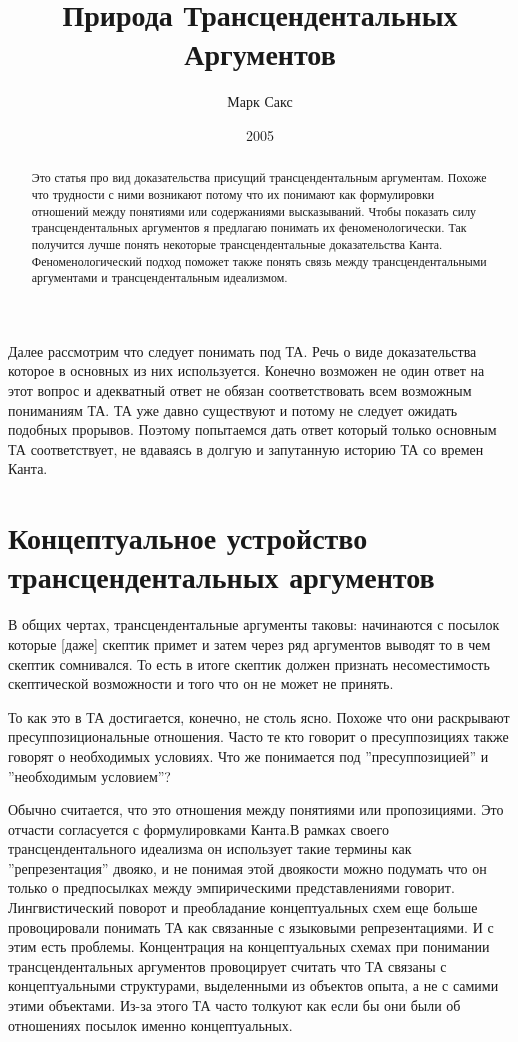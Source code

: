 \documentclass{article}
\title{Природа Трансцендентальных Аргументов}
\author{Марк Сакс}
\date{2005}
\begin{document}
\maketitle

\begin{abstract}
Это статья про вид доказательства присущий трансцендентальным аргументам. Похоже что трудности с ними возникают потому что их понимают как формулировки отношений между понятиями или содержаниями высказываний. Чтобы показать силу трансцендентальных аргументов я предлагаю понимать их феноменологически. Так получится лучше понять некоторые трансцендентальные доказательства Канта. Феноменологический подход поможет также понять связь между трансцендентальными аргументами и трансцендентальным идеализмом.
\end{abstract}

Далее рассмотрим что следует понимать под ТА. Речь о виде доказательства которое в основных из них используется. Конечно возможен не один ответ на этот вопрос и адекватный ответ не обязан соответствовать всем возможным пониманиям ТА. ТА уже давно существуют и потому не следует ожидать подобных прорывов. Поэтому попытаемся дать ответ который только основным ТА соответствует, не вдаваясь в долгую и запутанную историю ТА со времен Канта.

\section{Концептуальное устройство трансцендентальных аргументов}

В общих чертах, трансцендентальные аргументы таковы: начинаются с посылок которые [даже] скептик примет и затем через ряд аргументов выводят то в чем скептик сомнивался. То есть в итоге скептик должен признать несоместимость скептической возможности и того что он не может не принять.

То как это в ТА достигается, конечно, не столь ясно. Похоже что они раскрывают пресуппозициональные отношения. Часто те кто говорит о пресуппозициях также говорят о необходимых условиях. Что же понимается под ''пресуппозицией'' и ''необходимым условием''?

Обычно считается, что это отношения между понятиями или пропозициями. Это отчасти согласуется с формулировками Канта.В рамках своего трансцендентального идеализма он использует такие термины как ''репрезентация'' двояко, и не понимая этой двоякости можно подумать что он только о предпосылках между эмпирическими представлениями говорит. Лингвистический поворот и преобладание концептуальных схем еще больше провоцировали понимать ТА как связанные с языковыми репрезентациями. И с этим есть проблемы. Концентрация на концептуальных схемах при понимании трансцендентальных аргументов провоцирует считать что ТА связаны с концептуальными структурами, выделенными из объектов опыта, а не с самими этими объектами. Из-за этого ТА часто толкуют как если бы они были об отношениях посылок именно концептуальных.
\end{document}
